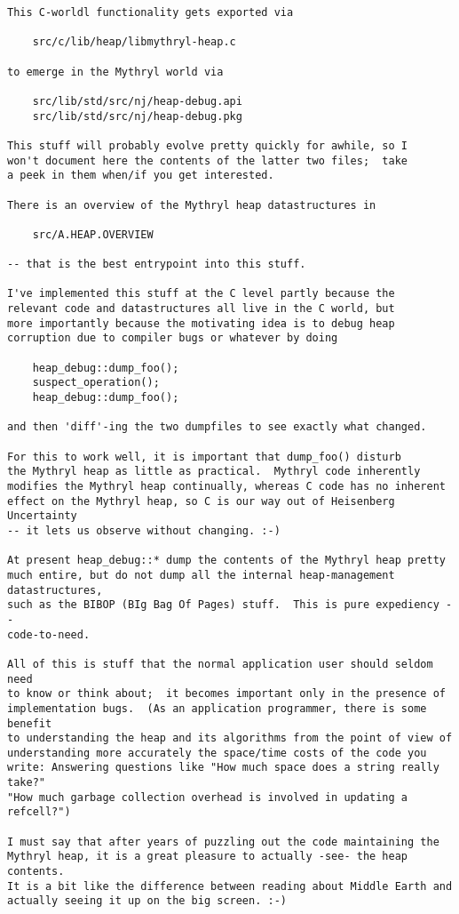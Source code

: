 \begin{verbatim}
This C-worldl functionality gets exported via 
 
    src/c/lib/heap/libmythryl-heap.c 
 
to emerge in the Mythryl world via 
 
    src/lib/std/src/nj/heap-debug.api 
    src/lib/std/src/nj/heap-debug.pkg 
 
This stuff will probably evolve pretty quickly for awhile, so I 
won't document here the contents of the latter two files;  take 
a peek in them when/if you get interested. 
 
There is an overview of the Mythryl heap datastructures in 
 
    src/A.HEAP.OVERVIEW 
 
-- that is the best entrypoint into this stuff. 
 
I've implemented this stuff at the C level partly because the 
relevant code and datastructures all live in the C world, but 
more importantly because the motivating idea is to debug heap 
corruption due to compiler bugs or whatever by doing 

    heap_debug::dump_foo(); 
    suspect_operation(); 
    heap_debug::dump_foo(); 
 
and then 'diff'-ing the two dumpfiles to see exactly what changed. 
 
For this to work well, it is important that dump_foo() disturb 
the Mythryl heap as little as practical.  Mythryl code inherently 
modifies the Mythryl heap continually, whereas C code has no inherent 
effect on the Mythryl heap, so C is our way out of Heisenberg Uncertainty 
-- it lets us observe without changing. :-) 
 
At present heap_debug::* dump the contents of the Mythryl heap pretty 
much entire, but do not dump all the internal heap-management datastructures, 
such as the BIBOP (BIg Bag Of Pages) stuff.  This is pure expediency -- 
code-to-need. 
 
All of this is stuff that the normal application user should seldom need 
to know or think about;  it becomes important only in the presence of 
implementation bugs.  (As an application programmer, there is some benefit 
to understanding the heap and its algorithms from the point of view of 
understanding more accurately the space/time costs of the code you 
write: Answering questions like "How much space does a string really take?" 
"How much garbage collection overhead is involved in updating a 
refcell?") 
 
I must say that after years of puzzling out the code maintaining the
Mythryl heap, it is a great pleasure to actually -see- the heap contents.
It is a bit like the difference between reading about Middle Earth and
actually seeing it up on the big screen. :-)


\end{verbatim}
